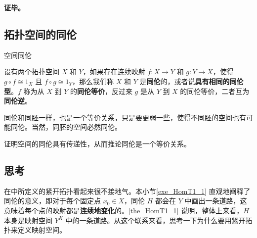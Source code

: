 \textbf{证毕。}

\subsection{拓扑空间的同伦}

\begin{definition}{空间同伦}

设有两个拓扑空间 $X$ 和 $Y$，如果存在连续映射 $f:X\rightarrow Y$ 和 $g: Y\rightarrow X$，使得 $g \circ f \cong 1_X$ 且 $f \circ g \cong 1_Y$，那么我们称 $X$ 和 $Y$ 是\textbf{同伦}的，或者说\textbf{具有相同的同伦型}。$f$ 称为从 $X$ 到 $Y$ 的\textbf{同伦等价}，反过来 $g$ 是从 $Y$ 到 $X$ 的同伦等价，二者互为\textbf{同伦逆}。

\end{definition}

同伦和同胚一样，也是一个等价关系，只是要更弱一些，使得不同胚的空间也有可能同伦。当然，同胚的空间必然同伦。

\begin{exercise}{}
证明空间的同伦具有传递性，从而推论同伦是一个等价关系。
\end{exercise}

\subsection{思考}

在中所定义的紧开拓扑看起来很不接地气。本小节\autoref{exe_HomT1_1} 直观地阐释了同伦的意义，即对于每个固定点 $x_0\in X$，同伦 $H$ 都会在 $Y$ 中画出一条道路，这意味着每个点的映射都是\textbf{连续地变化}的。\autoref{the_HomT1_1} 说明，整体上来看，$H$ 本身是映射空间 $Y^X$ 中的一条道路。从这个联系来看，思考一下为什么要用紧开拓扑来定义映射空间。

